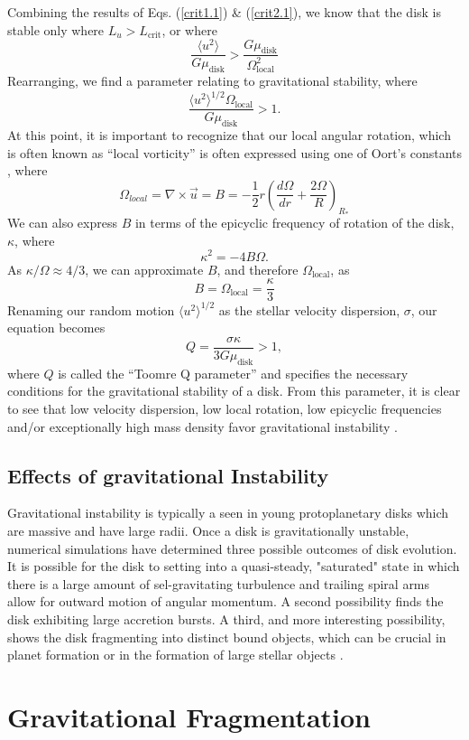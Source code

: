 \documentclass[aps,pra,twocolumn]{revtex4-1}
\begin{document}
Combining the results of Eqs. (\ref{crit1.1}) \& (\ref{crit2.1}), we know that the disk is stable only where $L_u > L_\text{crit}$, or where
\begin{equation}
\frac{\langle u^2 \rangle}{G\mu_\text{disk}} > \frac{G \mu_\text{disk}}{\Omega_\text{local}^2} \nonumber
\end{equation}
Rearranging, we find a parameter relating to gravitational stability, where \cite{whittle2010}
\begin{equation}
\frac{\langle u^2 \rangle^{1/2} \Omega_\text{local}}{G\mu_\text{disk}} > 1.
\end{equation}
At this point, it is important to recognize that our local angular rotation, which is often known as ``local vorticity'' is often expressed using one of Oort's constants \cite{whittle2010}, where
\begin{equation}
\Omega_{local} = \nabla \times \vec{u} = B = -\frac{1}{2}r\left(\frac{d\Omega}{dr} + \frac{2\Omega}{R}  \right)_{R_*}
\end{equation}
We can also express $B$ in terms of the epicyclic frequency of rotation of the disk, $\kappa$, where \cite{whittle2010}
\begin{equation}
\kappa^2 = -4B\Omega.
\end{equation}
As $\kappa/\Omega \approx 4/3$, we can approximate $B$, and therefore $\Omega_\text{local}$, as
\begin{equation}
B = \Omega_\text{local} = \frac{\kappa}{3}
\end{equation}
Renaming our random motion $\langle u^2 \rangle ^{1/2}$ as the stellar velocity dispersion, $\sigma$, our equation becomes
\begin{equation}
Q = \frac{\sigma \kappa}{3G\mu_\text{disk}} > 1,
\end{equation}
where $Q$ is called the ``Toomre Q parameter'' and specifies the necessary conditions for the gravitational stability of a disk.  From this parameter, it is clear to see that low velocity dispersion, low local rotation, low epicyclic frequencies and/or exceptionally high mass density favor gravitational instability \cite{whittle2010}.

\subsection{\label{section 3.1} Effects of gravitational Instability}
Gravitational instability is typically a seen in young protoplanetary disks which are massive and have large radii.  Once a disk is gravitationally unstable, numerical simulations have determined three possible outcomes of disk evolution.  It is possible for the disk to setting into a quasi-steady, "saturated" state in which there is a large amount of sel-gravitating turbulence and trailing spiral arms allow for outward motion of angular momentum.  A second possibility finds the disk exhibiting large accretion bursts.  A third, and more interesting possibility, shows the disk fragmenting into distinct bound objects, which can be crucial in planet formation or in the formation of large stellar objects \cite{armitage2011}.

\section{\label{section 4}Gravitational Fragmentation}
\cite{whitworth2007}



\end{document}

